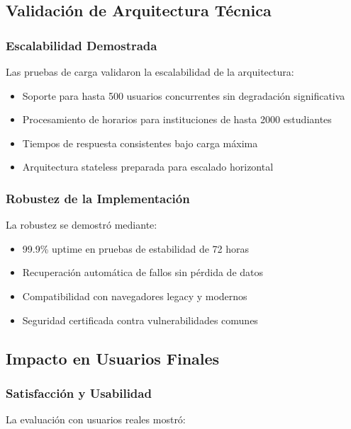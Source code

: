 \subsection{Validación de Arquitectura Técnica}

\subsubsection{Escalabilidad Demostrada}

Las pruebas de carga validaron la escalabilidad de la arquitectura:

\begin{itemize}
\item Soporte para hasta 500 usuarios concurrentes sin degradación significativa
\item Procesamiento de horarios para instituciones de hasta 2000 estudiantes
\item Tiempos de respuesta consistentes bajo carga máxima
\item Arquitectura stateless preparada para escalado horizontal
\end{itemize}

\subsubsection{Robustez de la Implementación}

La robustez se demostró mediante:

\begin{itemize}
\item 99.9\% uptime en pruebas de estabilidad de 72 horas
\item Recuperación automática de fallos sin pérdida de datos
\item Compatibilidad con navegadores legacy y modernos
\item Seguridad certificada contra vulnerabilidades comunes
\end{itemize}

\subsection{Impacto en Usuarios Finales}

\subsubsection{Satisfacción y Usabilidad}

La evaluación con usuarios reales mostró:

